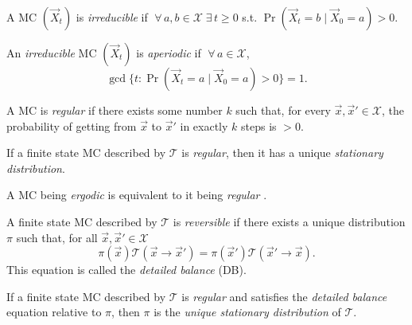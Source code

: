 \begin{definition}
    A MC $(\vec X_t)$ is \emph{irreducible} if $\;\forall\, a, b \in \mathcal X \;\exists\, t \geq 0$ s.t. $\Pr(\vec X_t = b \mid \vec X_0 = a) > 0$.
\end{definition}

\begin{definition}
    An \emph{irreducible} MC $(\vec X_t)$ is \emph{aperiodic} if $\;\forall\, a \in \mathcal X$,
    \begin{equation}
        \gcd\{t: \Pr(\vec X_t = a \mid \vec X_0 = a) > 0\} = 1.
    \end{equation}
\end{definition}

\begin{definition}
    A MC is \emph{regular} if there exists some number $k$ such that, for every $\vec x, \vec x' \in \mathcal X$, the probability of getting from $\vec x$ to $\vec x'$ in exactly $k$ steps is $> 0$.
\end{definition}

\begin{theorem}
    \label{thm:reg}
    If a finite state MC described by $\mathcal T$ is \emph{regular}, then it has a unique \emph{stationary distribution}.
\end{theorem}

A MC being \emph{ergodic} is equivalent to it being \emph{regular} \cite[p.~510]{book:dknf}.

\begin{definition}
    A finite state MC described by $\mathcal T$ is \emph{reversible} if there exists a unique distribution $\pi$ such that, for all $\vec x, \vec x' \in \mathcal X$
    \begin{equation}
        \label{eqn:db}
        \pi(\vec x)\mathcal T(\vec x \to \vec x') = \pi(\vec x')\mathcal T(\vec x' \to \vec x).
    \end{equation}
    This equation is called the \emph{detailed balance} (DB).
\end{definition}

\begin{proposition}
    If a finite state MC described by $\mathcal T$ is \emph{regular} and satisfies the \emph{detailed balance} equation relative to $\pi$, then $\pi$ is the \emph{unique stationary distribution} of $\mathcal T$.
\end{proposition}

